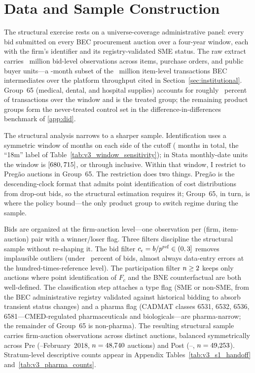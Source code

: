 \section{Data and Sample Construction}\label{sec:data}

The structural exercise rests on a universe-coverage administrative panel: every bid submitted on every BEC procurement auction over a four-year window, each with the firm's identifier and its registry-validated SME status. The raw extract carries \nBidsRaw~million bid-level observations across \nItemsRaw{} items, \nPurchaseOrders{} purchase orders, and \nPbu{} public buyer units---a \nDataMonths-month subset of the \itemTransactionsCount~million item-level transactions BEC intermediates over the platform throughput cited in Section~\ref{sec:institutional}. Group~65 (medical, dental, and hospital supplies) accounts for roughly \groupSixtyfivePctTx{}~percent of transactions over the window and is the treated group; the remaining \controlGroupCount{} product groups form the never-treated control set in the difference-in-differences benchmark of \ref{app:did}.

The structural analysis narrows to a sharper sample. Identification uses a symmetric window of \structuralWindowM{} months on each side of the \policyCutoffMonth{} cutoff (\nDataMonths{} months in total, the ``18m'' label of Table~\ref{tab:v3_window_sensitivity}); in Stata monthly-date units the window is $[680, 715]$, or \windowStart{} through \windowEnd{} inclusive. Within that window, I restrict to Preg\~ao auctions in Group~65. The restriction does two things. Preg\~ao is the descending-clock format that admits point identification of cost distributions from drop-out bids, so the structural estimation requires it; Group~65, in turn, is where the policy bound---the only product group to switch regime during the sample.

Bids are organized at the firm-auction level---one observation per (firm, item-auction) pair with a winner/loser flag. Three filters discipline the structural sample without re-shaping it. The bid filter $c_\epsilon = b / p^{\mathrm{ref}} \in (0, 3]$ removes implausible outliers (under \nFilteredOutPct{}~percent of bids, almost always data-entry errors at the hundred-times-reference level). The participation filter $n \ge 2$ keeps only auctions where point identification of $F_c$ and the BNE counterfactual are both well-defined. The classification step attaches a type flag (SME or non-SME, from the BEC administrative registry validated against historical bidding to absorb transient status changes) and a pharma flag (CADMAT classes 6531, 6532, 6536, 6581---CMED-regulated pharmaceuticals and biologicals---are pharma-narrow; the remainder of Group~65 is non-pharma). The resulting structural sample carries \nObsAuctions{} firm-auction observations across \nDistinctAuctions{} distinct auctions, balanced symmetrically across Pre (\windowStart{}--February~2018, $n = 48{,}740{}$ auctions) and Post (\policyCutoffMonth{}--\windowEnd, $n = 49{,}253$). Stratum-level descriptive counts appear in Appendix Tables~\ref{tab:v3_s1_handoff} and~\ref{tab:v3_pharma_counts}.

